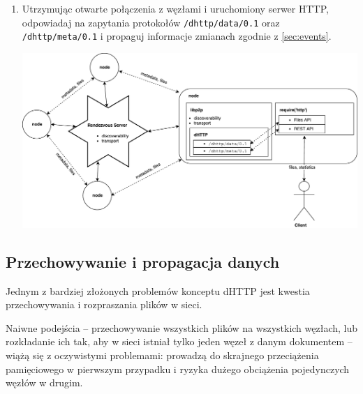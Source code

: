 \begin{enumerate}[noitemsep]
    \item Utrzymując otwarte połączenia z węzłami i uruchomiony serwer HTTP, odpowiadaj na zapytania protokołów \texttt{/dhttp/data/0.1} oraz \texttt{/dhttp/meta/0.1} i propaguj informacje zmianach zgodnie z \ref{sec:events}. \\ \parbox{\linewidth}{\centering \includegraphics[scale=0.5]{communication-flow.pdf}}
\end{enumerate}





\subsection{Przechowywanie i propagacja danych}
\label{sec:dataPropagation}

Jednym z bardziej złożonych problemów konceptu dHTTP jest kwestia przechowywania i rozpraszania plików w sieci.

Naiwne podejścia -- przechowywanie wszystkich plików na wszystkich węzłach, lub rozkładanie ich tak, aby w sieci istniał tylko jeden węzeł z danym dokumentem -- wiążą się z oczywistymi problemami: prowadzą do skrajnego przeciążenia pamięciowego w pierwszym przypadku i ryzyka dużego obciążenia pojedynczych węzłów w drugim. 

